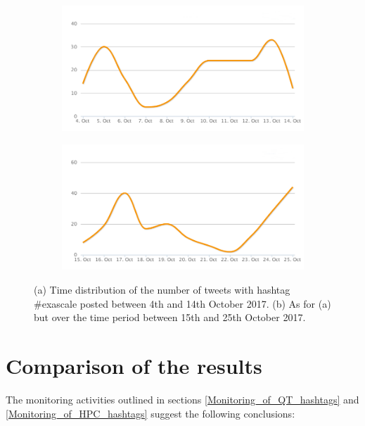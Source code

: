\begin{figure}
 \centering
 \begin{subfigure}[b]{0.9\textwidth}
   \includegraphics[width=1\linewidth]{Images/FirstSearch_Exascale.png}
   \caption{} 
 \end{subfigure}

 \begin{subfigure}[b]{0.9\textwidth}
   \includegraphics[width=1\linewidth]{Images/SecondSearch_Exascale.png}
   \caption{}
 \end{subfigure}
 \caption{(a) Time distribution of the number of tweets with hashtag \#exascale posted between 4th and 14th October 2017. (b) As for (a) but over the time period between 15th and 25th October 2017.} 
 \label{First-SecondSearch_Exascale}
\end{figure}

\section{Comparison of the results} \label{Comparison_of_the_results}
The monitoring activities outlined in sections \ref{Monitoring_of_QT_hashtags} and \ref{Monitoring_of_HPC_hashtags} suggest the following conclusions:

